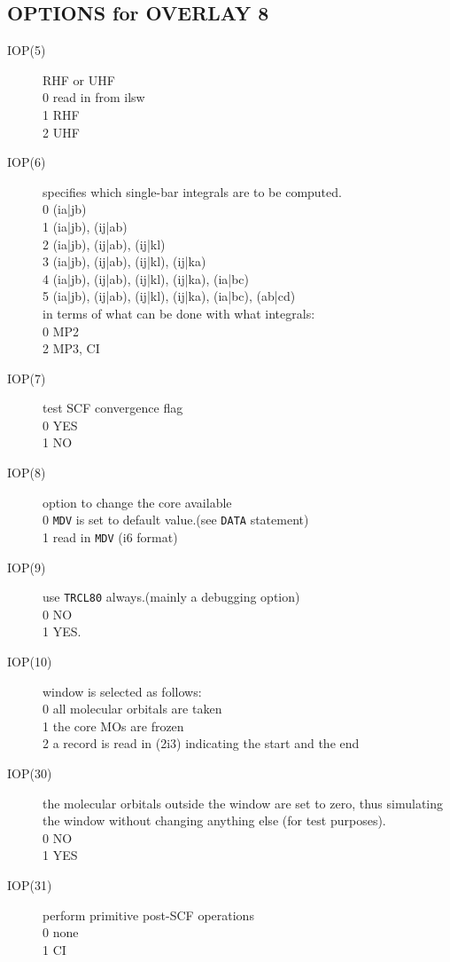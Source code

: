 \subsection{\sf OPTIONS for OVERLAY 8}
\begin{description}
\item[IOP(5)]  RHF or UHF \\
0  read in from ilsw \\
1  RHF \\
2  UHF \\
\item[IOP(6)]  specifies which single-bar integrals are to be
computed. \\
0  (ia|jb) \\
1  (ia|jb), (ij|ab) \\
2  (ia|jb), (ij|ab), (ij|kl) \\
3  (ia|jb), (ij|ab), (ij|kl), (ij|ka) \\
4  (ia|jb), (ij|ab), (ij|kl), (ij|ka), (ia|bc) \\
5  (ia|jb), (ij|ab), (ij|kl), (ij|ka), (ia|bc), (ab|cd) \\
in terms of what can be done with what integrals: \\
0  MP2 \\
2  MP3, CI \\
\item[IOP(7)]  test SCF convergence flag \\
0  YES \\
1  NO \\
\item[IOP(8)]  option to change the core available \\
0  {\tt MDV} is set to default value.(see {\tt DATA} statement) \\
1  read in {\tt MDV} (i6 format) \\
\item[IOP(9)]  use {\tt TRCL80} always.(mainly a debugging option) \\
0  NO \\
1  YES. \\
\item[IOP(10)]  window is selected as follows: \\
0  all molecular orbitals are taken \\
1  the core MOs are frozen \\
2  a record is read in (2i3) indicating the start and the end 
\item[IOP(30)]  the molecular orbitals outside the window are set to zero,
thus simulating the window without changing anything else (for
test purposes). \\
0  NO \\
1  YES \\
\item[IOP(31)]  perform primitive post-SCF operations \\
0  none \\
1  CI \\
\end{description}
